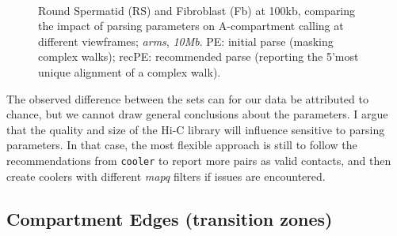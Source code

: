 \documentclass[
  11pt,
  a4paper,
]{scrbook}
\let\oldemph\emph
\renewcommand\emph[1]{\oldemph{\color{gray}#1}}
\begin{document}
\begin{figure}
\begin{minipage}{0.40\linewidth}
{}


\end{minipage}%
%
\begin{minipage}{0.40\linewidth}



\end{minipage}%
%
\begin{minipage}{0.10\linewidth}
~\end{minipage}%

\caption{\label{fig-rs-fb-100-pe-recpe-intervals}Round Spermatid (RS)
and Fibroblast (Fb) at 100kb, comparing the impact of parsing parameters
on A-compartment calling at different viewframes; \emph{arms},
\emph{10Mb}. PE: initial parse (masking complex walks); recPE:
recommended parse (reporting the 5'most unique alignment of a complex
walk).}

\end{figure}%

The observed difference between the sets can for our data be attributed
to chance, but we cannot draw general conclusions about the parameters.
I argue that the quality and size of the Hi-C library will influence
sensitive to parsing parameters. In that case, the most flexible
approach is still to follow the recommendations from \texttt{cooler} to
report more pairs as valid contacts, and then create coolers with
different \emph{mapq} filters if issues are encountered.

\subsection{Compartment Edges (transition
zones)}\label{compartment-edges-transition-zones}
\end{document}
